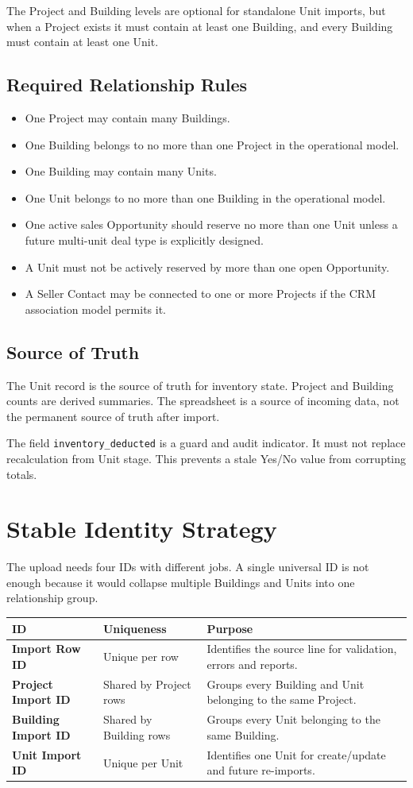 \documentclass[10pt]{article}
\newcommand{\key}[1]{\texttt{\small #1}}
\begin{document}
The Project and Building levels are optional for standalone Unit imports, but when a Project exists it must contain at least one Building, and every Building must contain at least one Unit.

\subsection{Required Relationship Rules}
\begin{itemize}
\item One Project may contain many Buildings.
\item One Building belongs to no more than one Project in the operational model.
\item One Building may contain many Units.
\item One Unit belongs to no more than one Building in the operational model.
\item One active sales Opportunity should reserve no more than one Unit unless a future multi-unit deal type is explicitly designed.
\item A Unit must not be actively reserved by more than one open Opportunity.
\item A Seller Contact may be connected to one or more Projects if the CRM association model permits it.
\end{itemize}

\subsection{Source of Truth}
The Unit record is the source of truth for inventory state. Project and Building counts are derived summaries. The spreadsheet is a source of incoming data, not the permanent source of truth after import.

The field \key{inventory\_deducted} is a guard and audit indicator. It must not replace recalculation from Unit stage. This prevents a stale Yes/No value from corrupting totals.

\section{Stable Identity Strategy}
The upload needs four IDs with different jobs. A single universal ID is not enough because it would collapse multiple Buildings and Units into one relationship group.

\begin{tabularx}{\linewidth}{>{\bfseries}p{1.55in}p{1.0in}X}
\toprule
ID & Uniqueness & Purpose\\
\midrule
Import Row ID & Unique per row & Identifies the source line for validation, errors and reports.\\
Project Import ID & Shared by Project rows & Groups every Building and Unit belonging to the same Project.\\
Building Import ID & Shared by Building rows & Groups every Unit belonging to the same Building.\\
Unit Import ID & Unique per Unit & Identifies one Unit for create/update and future re-imports.\\
\bottomrule
\end{tabularx}
\end{document}
